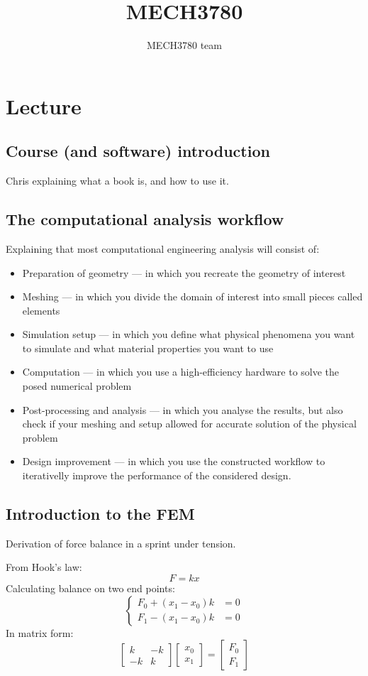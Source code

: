 \documentclass{article}
\title{MECH3780}
\author{MECH3780 team}
\newcommand{\vectwo}[2]{\left[\begin{matrix}#1\\#2\end{matrix}\right]}
\newcommand{\mattwo}[4]{\left[\begin{matrix}#1 & #3\\#2 & #4\end{matrix}\right]}
\begin{document}
\maketitle
\section{Lecture}
\subsection{Course (and software) introduction}
Chris explaining what a book is, and how to use it.
\subsection{The computational analysis workflow}
Explaining that most computational engineering analysis will consist of:
\begin{itemize}
\item Preparation of geometry --- in which you recreate the geometry of interest
\item Meshing --- in which you divide the domain of interest into small pieces called elements
\item Simulation setup --- in which you define what physical phenomena you want to simulate and what material properties you want to use
\item Computation --- in which you use a high-efficiency hardware to solve the posed numerical problem
\item Post-processing and analysis --- in which you analyse the results, but also check if your meshing and setup allowed for accurate solution of the physical problem
\item Design improvement --- in which you use the constructed workflow to iterativelly improve the performance of the considered design.
\end{itemize}
\subsection{Introduction to the FEM}
Derivation of force balance in a sprint under tension.

From Hook's law:
\[F = kx\]
Calculating balance on two end points:
\[\begin{cases}
    F_0 + (x_1 - x_0)k &= 0\\
    F_1 - (x_1 - x_0)k &= 0
\end{cases}\]
In matrix form:
\[\mattwo{k}{-k}{-k}{k}\vectwo{x_0}{x_1}=\vectwo{F_0}{F_1}\]
\end{document}
